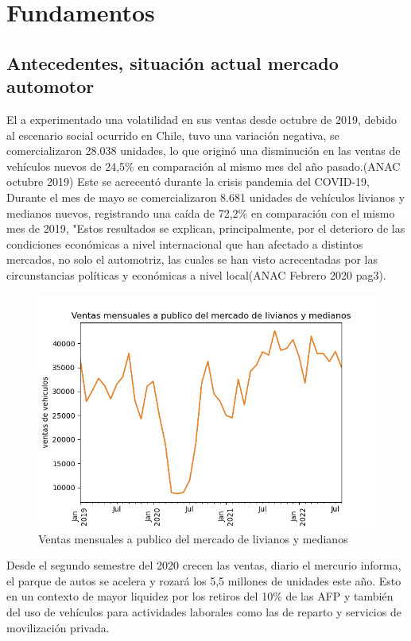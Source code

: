 \documentclass[a4papper,11pt]{article}
\begin{document}
  \section{Fundamentos}
    \subsection{Antecedentes, situación actual mercado automotor} 
      El \mlm a experimentado una volatilidad en sus ventas desde octubre de 2019, debido al escenario  social ocurrido en Chile, tuvo una variación negativa, se comercializaron 28.038 unidades, lo que originó una disminución en las ventas de vehículos nuevos de 24,5\% en comparación al mismo mes del año pasado.(ANAC octubre 2019)
      Este se acrecentó durante la crisis pandemia del COVID-19, Durante el mes de mayo se comercializaron 8.681 unidades de vehículos livianos y medianos nuevos, registrando una caída de 72,2\% en comparación con el mismo mes de 2019, "Estos resultados se explican, principalmente, por el deterioro de las condiciones económicas a nivel internacional que han afectado a distintos mercados, no solo el automotriz, las cuales se han visto acrecentadas por las circunstancias políticas y económicas a nivel local(ANAC Febrero 2020 pag3).
        \begin{figure}[h]
        \centering
        \includegraphics[width=\textwidth]{anac.png}
        \caption{Ventas mensuales a publico del mercado de livianos y medianos}
        \label{fig:anac}
        \end{figure}
      Desde el segundo semestre del 2020 \mlm crecen las ventas, diario el mercurio informa, el parque de autos se acelera y rozará los 5,5 millones de unidades este año. Esto en un contexto de mayor liquidez por los retiros del 10\% de las AFP y también del uso de vehículos para actividades laborales como las de reparto y servicios de movilización privada.
\end{document}
